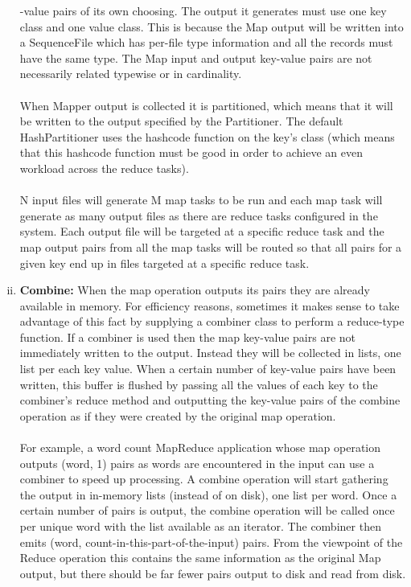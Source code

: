 \documentclass[a4paper,12pt,oneside]{report}
\begin{document}
\begin{enumerate}[(i)]
                -value pairs of its own choosing. The output it generates must use one key class and one value class. 
                This is because the Map output will be written into a SequenceFile which has per-file type information 
                and all the records must have the same type. 
                The Map input and output key-value pairs are not necessarily related typewise or in cardinality.\\ 
                \\
                When Mapper output is collected it is partitioned, which means that it will be written to the output 
                specified by the Partitioner. The default HashPartitioner uses the hashcode function on the key's class 
                (which means that this hashcode function must be good in order to achieve an even workload across the reduce tasks).\\ 
                \\
                N input files will generate M map tasks to be run and each map task will generate as many output files 
                as there are reduce tasks configured in the system. Each output file will be targeted at a specific reduce 
                task and the map output pairs from all the map tasks will be routed so that all pairs for a given key end up in 
                files targeted at a specific reduce task.

        \item \textbf{Combine:} When the map operation outputs its pairs they are already available in memory. For efficiency 
            reasons, sometimes it makes sense to take advantage of this fact by supplying a combiner class to perform 
            a reduce-type function. If a combiner is used then the map key-value pairs are not immediately written 
            to the output. Instead they will be collected in lists, one list per each key value. When a certain 
            number of key-value pairs have been written, this buffer is flushed by passing all the values of each 
            key to the combiner's reduce method and outputting the key-value pairs of the combine operation as if 
            they were created by the original map operation.\\ 
                \\
                For example, a word count MapReduce application whose map operation outputs (word, 1) pairs as words 
                are encountered in the input can use a combiner to speed up processing. A combine operation will start 
                gathering the output in in-memory lists (instead of on disk), one list per word. Once a certain number 
                of pairs is output, the combine operation will be called once per unique word with the list available 
                as an iterator. The combiner then emits (word, count-in-this-part-of-the-input) pairs. From the viewpoint 
                of the Reduce operation this contains the same information as the original Map output, but there should 
                be far fewer pairs output to disk and read from disk. 


\end{enumerate}
\end{document}
